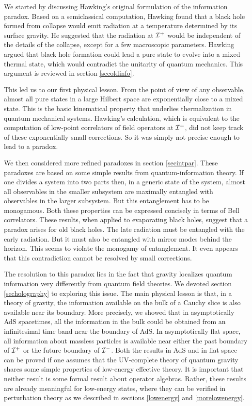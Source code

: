 \documentclass[12pt]{article}
\def \scrip{{\cal I}^{+}}
\def \scrim{{\cal I}^{-}}
\begin{document}
We started by discussing Hawking's original formulation of the information paradox. Based on a semiclassical computation, Hawking found that a black hole formed from collapse would emit radiation at a temperature determined by its surface gravity. He suggested that the radiation at $\scrip$ would be independent of the details of the collapse, except for a few macroscopic parameters. Hawking argued that black hole formation could lead a pure state to evolve into a mixed thermal state, which would contradict the unitarity of quantum mechanics. This argument is reviewed in section \ref{secoldinfo}.

This led us to our first physical lesson. From the point of view of 
any observable, almost all pure states in a large Hilbert space are exponentially close to a mixed state. This is the basic kinematical property that underlies
thermalization in quantum mechanical systems. Hawking's calculation, which is
equivalent to the computation of low-point correlators of field operators at $\scrip$, did not keep track of these exponentially small corrections. So it was simply not precise enough to lead to a paradox. 

We then considered more refined paradoxes in section \ref{secintpar}. These paradoxes
are based on some simple results from quantum-information theory. If one
divides a system into two parts then, in a generic state of the system, almost all observables in the smaller subsystem are maximally entangled with
observables in the larger subsystem. But this entanglement has to be monogamous. Both these properties can be expressed concisely in terms of Bell correlators. These results, when applied to evaporating black holes,  suggest that a paradox arises for old black holes. The late radiation must be entangled with the early radiation. But it must also be entangled
with mirror modes behind the horizon. This seems to violate the monogamy of entanglement. It even appears that this contradiction cannot
be resolved by small corrections.

The resolution to this paradox lies in the fact that gravity localizes 
quantum information very differently from quantum field theories. We devoted section \ref{secholography} to exploring this issue. The main physical lesson is that, in
a theory of gravity, the information available on the bulk of a 
Cauchy slice is also available near its boundary. More precisely, 
we showed that in asymptotically AdS spacetimes, all the information
in the bulk could be obtained from an infinitesimal time band near the boundary
of AdS. In asymptotically flat space, all information about massless particles
is available near either the past boundary of $\scrip$ or the future boundary of $\scrim$. Both the results in AdS and in flat space can be  proved if one assumes that the UV-complete theory of quantum gravity shares some simple properties of low-energy effective theory. It is important that neither result is
some formal result about operator algebras. Rather, these results are already
meaningful for low-energy states, where they can be verified in perturbation theory as we described in sections \ref{lowenergy} and \ref{morelowenergy}.
\end{document}
